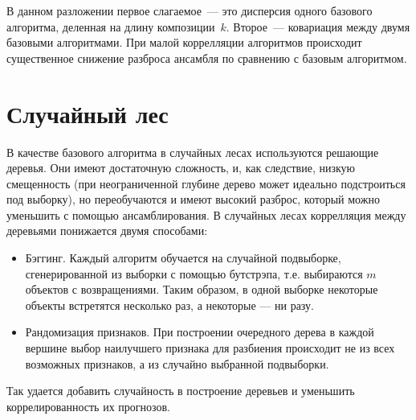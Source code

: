 \documentclass{article}
\begin{document}
В данном разложении первое слагаемое~--- это дисперсия одного базового алгоритма,
деленная на длину композиции~$k$.
Второе~--- ковариация между двумя базовыми алгоритмами.
При малой коррелляции алгоритмов происходит существенное снижение разброса ансамбля по сравнению с базовым алгоритмом.

\section{Случайный лес} \label{sec:random_forest}
В качестве базового алгоритма в случайных лесах используются решающие деревья. Они имеют достаточную сложность, и, как следствие, низкую смещенность (при неограниченной глубине дерево может идеально подстроиться под выборку), но переобучаются и имеют высокий разброс, который можно уменьшить с помощью ансамблирования. В случайных лесах коррелляция между деревьями понижается двумя способами:
\begin{itemize}
  \item Бэггинг. Каждый алгоритм обучается на случайной подвыборке, сгенерированной из выборки с помощью бутстрэпа, т.е. выбираются $m$ объектов с возвращениями. Таким образом, в одной выборке некоторые объекты встретятся несколько раз, а некоторые — ни разу.
  \item Рандомизация признаков. При построении очередного дерева в каждой вершине выбор наилучшего признака для разбиения происходит не из всех возможных признаков, а из случайно выбранной подвыборки. 
\end{itemize}
Так удается добавить случайность в построение деревьев и уменьшить коррелированность их прогнозов.





\end{document}
